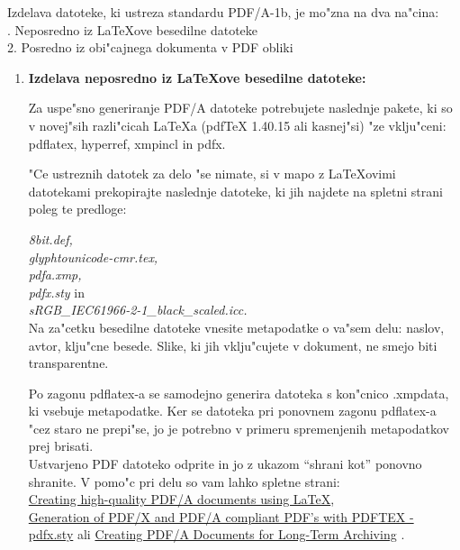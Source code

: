 Izdelava datoteke, ki ustreza standardu PDF/A-1b, je mo"zna na dva na"cina:\\

. Neposredno iz \LaTeX{ove} besedilne datoteke\\
2. Posredno iz obi"cajnega dokumenta v PDF obliki\\

\begin{enumerate}
\item{\bf Izdelava neposredno iz \LaTeX{ove} besedilne datoteke:}

Za uspe"sno generiranje PDF/A datoteke potrebujete naslednje pakete, ki so v novej"sih razli"cicah \LaTeX{a} (pdfTeX 1.40.15 ali kasnej"si) "ze vklju"ceni: pdflatex, hyperref, xmpincl in pdfx.

"Ce ustreznih datotek za delo "se nimate, si v mapo z \LaTeX{ovimi} datotekami prekopirajte naslednje datoteke, ki jih najdete na spletni strani poleg te predloge:

\noindent
{\it 8bit.def,\\
 glyphtounicode-cmr.tex,\\
 pdfa.xmp, \\
pdfx.sty} in \\
{\it sRGB_IEC61966-2-1_black_scaled.icc.}\\

Na za"cetku besedilne datoteke vnesite metapodatke o va"sem delu: naslov, avtor, klju"cne besede. 
Slike, ki jih vklju"cujete v dokument, ne smejo biti transparentne.

Po zagonu pdflatex-a se samodejno generira datoteka s kon"cnico .xmpdata, ki vsebuje metapodatke. Ker se datoteka pri ponovnem zagonu pdflatex-a "cez staro ne prepi"se, jo je potrebno v primeru spremenjenih metapodatkov prej brisati.\\

Ustvarjeno PDF datoteko odprite in jo z ukazom ``shrani kot'' ponovno shranite. V pomo"c pri delu so vam lahko spletne strani:\\
\href{http://www.mathstat.dal.ca/~selinger/pdfa/}{Creating high-quality PDF/A documents using LaTeX}\cite{Se},\\
\href{https://tug.org/tug2015/preprints/moore-pdfx.pdf}{Generation of PDF/X and PDF/A compliant PDF's with PDFTEX - pdfx.sty} \cite{Moo} ali 
\href{https://blog.zhaw.ch/icclab/creating-pdfa-documents-for-long-term-archiving}{Creating PDF/A Documents for Long-Term Archiving} \cite{Zhaw}.\\


\end{enumerate}
